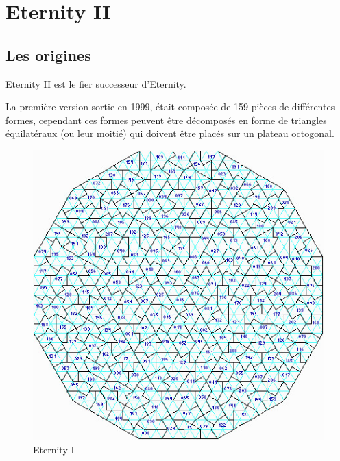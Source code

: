 \section{Eternity II}
	\subsection{Les origines}
		
	Eternity II est le fier successeur d'Eternity.
	
	La première version sortie en 1999, était composée de 159 pièces de différentes formes, cependant ces formes peuvent être décomposés en forme de triangles équilatéraux (ou leur moitié) qui doivent être placés sur un plateau octogonal. 
	
	\begin{figure}[H]
		\includegraphics[width=\linewidth]{images/eternity_1.jpg}
		\caption{Eternity I}\label{fig:eternity_1}
		\endminipage\hfill

\end{figure}

